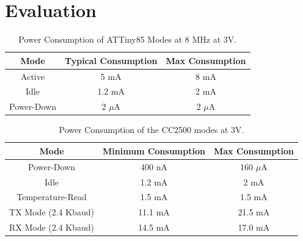 \section{Evaluation}
\label{section:evaluation}

%
%
\begin{table}%
  \begin{center}
  
  \begin{tabular}{| c | c | c |}

  \hline
  \textbf{Mode} & \textbf{Typical Consumption} & \textbf{Max Consumption} \\
  \hline
  Active      & 5 mA & 8 mA \\
  Idle        & 1.2 mA & 2 mA \\
  Power-Down  & 2 $\mu$A & 2 $\mu$A \\
  \hline
  
  \end{tabular}
  \end{center}
  \caption{Power Consumption of ATTiny85 Modes at 8 MHz at 3V.
  \label{table:attiny85_power}  
  }
\end{table}

%
%
\begin{table}%
  \begin{center}
  
  \begin{tabular}{| c | c | c |}

  \hline
  \textbf{Mode} & \textbf{Minimum Consumption} & \textbf{Max Consumption} \\
  \hline
  Power-Down        & 400 nA & 160 $\mu$A \\
  Idle              & 1.2 mA & 2 mA \\
  Temperature-Read  & 1.5 mA & 1.5 mA \\
  TX Mode (2.4 Kbaud) & 11.1 mA & 21.5 mA \\
  RX Mode (2.4 Kbaud) & 14.5 mA & 17.0 mA \\
  \hline
  
  \end{tabular}  
  \end{center}
  \caption{Power Consumption of the CC2500 modes at 3V.
  \label{table:cc2500_power}  
  }
\end{table}

